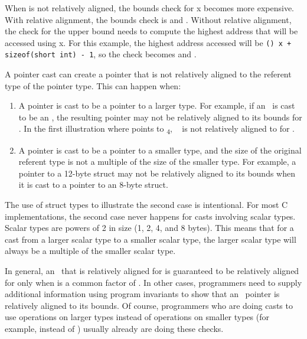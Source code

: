When  is not relatively aligned, the bounds check for x
becomes more expensive. With relative alignment, the bounds check is
 and . Without relative
alignment, the check for the upper bound needs to compute the highest
address that will be accessed using x. For this example, the highest
address accessed will be
\lstinline|(|\arrayptrchar\lstinline|) x + sizeof(short int) - 1|, so the check becomes 
 and .

A pointer cast can create a pointer that is not relatively aligned to
the referent type of the pointer type. This can happen when:

\begin{enumerate}
\item
  A pointer is cast to be a pointer to a larger type. For example, if an
  \ is cast to be an
  \arrayptrint , the resulting pointer
  may not be relatively aligned to its bounds for . In the
  first illustration where  points to \textsubscript{4},
  \arrayptrint\  is not relatively
  aligned to  for .
\item
  A pointer is cast to be a pointer to a smaller type, and the size of
  the original referent type is not a multiple of the size of the
  smaller type. For example, a pointer to a 12-byte struct may not be
  relatively aligned to its bounds when it is cast to a pointer to an
  8-byte struct.
\end{enumerate}

The use of struct types to illustrate the second case is intentional.
For most C implementations, the second case never happens for casts
involving scalar types. Scalar types are powers of 2 in size (1, 2, 4,
and 8 bytes). This means that for a cast from a larger scalar type to a
smaller scalar type, the larger scalar type will always be a multiple of
the smaller scalar type.

In general, an
\arrayptrT\ that is
relatively aligned for  is guaranteed to be relatively aligned
for  only
when  is a common factor of
. In other cases, programmers need to
supply additional information using program invariants to show that an
\arrayptr\ pointer is relatively aligned to its bounds. Of
course, programmers who are doing casts to use operations on larger
types instead of operations on smaller types (for example, 
instead of ) usually already are doing these checks.

